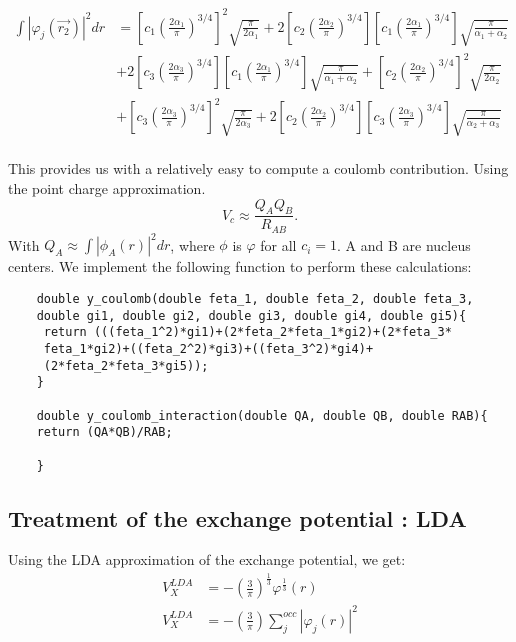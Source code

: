 \documentclass{article}
\begin{document}
   \begin{align*}
    \int |\varphi_j(\vec{r_2})|^2 dr                        &= \left[ c_1  \left( \frac{2\alpha_1}{\pi} \right)^{3/4} \right] ^2 \sqrt{\frac{\pi}{2\alpha_1}}  + 2 \left[ c_2 \left( \frac{2\alpha_2}{\pi} \right)^{3/4} \right] \left[ c_1  \left( \frac{2\alpha_1}{\pi} \right)^{3/4} \right] \sqrt{\frac{\pi}{\alpha_1+ \alpha_2}}\\
    &+ 2\left[ c_3 \left( \frac{2\alpha_3}{\pi} \right)^{3/4} \right] \left[ c_1  \left( \frac{2\alpha_1}{\pi} \right)^{3/4} \right] \sqrt{\frac{\pi}{\alpha_1 + \alpha_2}} + \left[ c_2  \left( \frac{2\alpha_2}{\pi} \right)^{3/4} \right] ^2 \sqrt{\frac{\pi}{2\alpha_2}} \\ 
    &+ \left[ c_3  \left( \frac{2\alpha_3}{\pi} \right)^{3/4} \right] ^2 \sqrt{\frac{\pi}{2\alpha_3}}  + 2 \left[ c_2 \left( \frac{2\alpha_2}{\pi} \right)^{3/4} \right] \left[ c_3  \left( \frac{2\alpha_3}{\pi} \right)^{3/4} \right] \sqrt{\frac{\pi}{\alpha_2 + \alpha_3}}  \\
   \end{align*}

This provides us with a relatively easy to compute a coulomb contribution. Using the point charge approximation.
   \[V_c \approx \frac{Q_AQ_B}{R_{AB}}. \]
   With $Q_A \approx \int |\phi_A(r)|^2dr $, where $\phi$ is $\varphi$ for all $c_i = 1$. A and B are nucleus centers. 
We implement the following function to perform these calculations:
   \begin{lstlisting}
    double y_coulomb(double feta_1, double feta_2, double feta_3, 
    double gi1, double gi2, double gi3, double gi4, double gi5){
     return (((feta_1^2)*gi1)+(2*feta_2*feta_1*gi2)+(2*feta_3*
     feta_1*gi2)+((feta_2^2)*gi3)+((feta_3^2)*gi4)+
     (2*feta_2*feta_3*gi5));
    }

    double y_coulomb_interaction(double QA, double QB, double RAB){
    return (QA*QB)/RAB;

    }

   \end{lstlisting}
\subsection{Treatment of the exchange potential : LDA}
Using the LDA approximation of the exchange potential, we get:
\begin{align*} 
    V^{LDA}_X  &= -(\frac{3}{\pi})^{\frac{1}{3}} \varphi^{\frac{1}{3}}(r) \\
    V^{LDA}_X   &= -(\frac{3}{\pi})\sum_{j}^{occ}|\varphi_j(r)|^2 \\
\end{align*}




 
\end{document}
